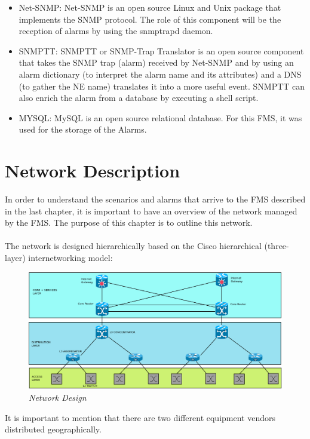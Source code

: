 \documentclass[10pt,a4paper]{report}
\begin{document}
\begin{itemize}
  \item Net-SNMP: Net-SNMP is an open source Linux and Unix package that implements the SNMP protocol. The role of this component will be the reception of alarms by using the snmptrapd daemon\cite{netsnmp}.
  \item SNMPTT: SNMPTT or SNMP-Trap Translator is an open source component that takes the SNMP trap (alarm) received by Net-SNMP and by using an alarm dictionary (to interpret the alarm name and its attributes) and a DNS (to gather the NE name) translates it into a more useful event. SNMPTT can also enrich the alarm from a database by executing a shell script.\cite{snmptt}
  \item MYSQL: MySQL is an open source relational database. For this FMS, it was used for the storage of the Alarms\cite{mysql}.
\end{itemize}

\chapter{Network Description}
In order to understand the scenarios and alarms that arrive to the FMS described in the last chapter, it is important to have an overview of the network managed by the FMS. The purpose of this chapter is to outline this network.
\\\\
The network is designed hierarchically based on the Cisco hierarchical (three-layer) internetworking model\cite{ciscoNetworkDesign}:

\begin{figure}[H]
 \includegraphics[scale=0.4]{Network_Architecture.png}
  \centering
  \caption{\textit{Network Design}}
  \label{fig:network_design}
\end{figure}	

It is important to mention that there are two different equipment vendors distributed geographically.
\end{document}
